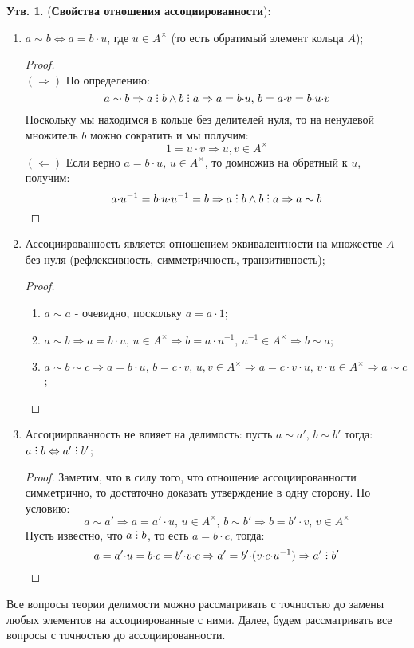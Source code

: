 \documentclass[12pt]{article}
\theoremstyle{definition}
\newtheorem{prop}{Утв.}
\DeclareRobustCommand{\divby}{%
	\mathrel{\text{\vbox{\baselineskip.65ex\lineskiplimit0pt\hbox{.}\hbox{.}\hbox{.}}}}%
}
\begin{document}
\begin{prop}(\textbf{Свойства отношения ассоциированности}):
	\begin{enumerate}[label=\arabic*)]
		\item $a \sim b \Leftrightarrow  a = b{\cdot}u$, где $u \in A^{\times}$ (то есть обратимый элемент кольца $A$);
		\begin{proof}\hfill\\
			$(\Rightarrow)$ По определению: 
			$$
				a \sim b \Rightarrow a \divby b \wedge b \divby a \Rightarrow a = b{\cdot}u, \, b = a{\cdot}v = b{\cdot}u{\cdot}v
			$$ 
			Поскольку мы находимся в кольце без делителей нуля, то на ненулевой множитель $b$ можно сократить и мы получим: 
			$$
				1 = u{\cdot}v \Rightarrow u,v \in A^{\times}
			$$
			$(\Leftarrow)$ Если верно $a = b{\cdot}u, \, u \in A^{\times}$, то домножив на обратный к $u$, получим:
			$$
				a{\cdot}u^{-1} = b{\cdot}u{\cdot}u^{-1} = b \Rightarrow a \divby b \wedge b \divby a \Rightarrow a \sim b
			$$
		\end{proof}
		\item Ассоциированность является отношением эквивалентности на множестве $A$ без нуля (рефлексивность, симметричность, транзитивность);
		\begin{proof}\hfill
			\begin{enumerate}[label=(\arabic*)]
				\item $a \sim a$ - очевидно, поскольку $a = a{\cdot}1$;
				\item $a \sim b \Rightarrow a = b{\cdot}u, \, u \in A^{\times} \Rightarrow b = a{\cdot}u^{-1}, \, u^{-1} \in A^{\times} \Rightarrow b \sim a$;
				\item $a \sim b \sim c \Rightarrow a = b{\cdot}u, \, b = c{\cdot}v, \, u,v \in A^{\times} \Rightarrow a = c{\cdot}v{\cdot}u, \, v{\cdot}u \in A^{\times} \Rightarrow a \sim c$;
			\end{enumerate}
		\end{proof}
		\item Ассоциированность не влияет на делимость: пусть $a \sim a', \, b \sim b'$ тогда: $a\divby b \Leftrightarrow a' \divby b'$;
		\begin{proof}
			Заметим, что в силу того, что отношение ассоциированности симметрично, то достаточно доказать утверждение в одну сторону. По условию:
			$$
				a \sim a' \Rightarrow a = a'{\cdot}u, \, u \in A^{\times}, \,  b \sim b' \Rightarrow b = b'{\cdot}v, \, v \in A^{\times}
			$$
			Пусть известно, что $a \divby b$, то есть $a = b{\cdot}c$, тогда:
			$$
				a = a'{\cdot}u = b{\cdot}c = b'{\cdot}v{\cdot}c \Rightarrow a' = b'{\cdot}(v{\cdot}c{\cdot}u^{-1}) \Rightarrow a' \divby b'
			$$
		\end{proof}
	\end{enumerate}
\end{prop}
\newpage
Все вопросы теории делимости можно рассматривать с точностью до замены любых элементов на ассоциированные с ними. Далее, будем рассматривать все вопросы с точностью до ассоциированности.
\end{document}
